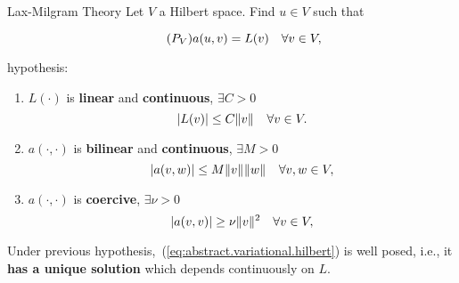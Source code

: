 \begin{frame}{Lax-Milgram Theory}
  \small
  Let $V$ a Hilbert space.
  Find $u\in V$ such that
    \begin{BlockNoTitle}
      \begin{equation}
        \tag{\ensuremath{P_V}}
        a(u,v) = L(v) \quad \forall v\in V,
        \label{eq:abstract.variational.hilbert}
      \end{equation}
    \end{BlockNoTitle}
     hypothesis:
    \begin{enumerate}
    \item $L(\cdot)$ is \textbf{linear} and \textbf{continuous},  $\exists C>0$ 
      \label{item:1}
      \begin{equation*}
        |L(v)|\le C \norm[]{v} \quad \forall v\in V.
      \end{equation*}
    \item $a(\cdot,\cdot)$ is \textbf{bilinear} and \textbf{continuous},  $\exists M>0$ 
      \label{item:2}
      \begin{equation*}
        |a(v,w)|\le M \norm[]{v}\norm[]{w} \quad\forall v,w\in V,
      \end{equation*}
    \item $a(\cdot,\cdot)$ is \textbf{coercive},  $\exists \nu>0$ 
      \label{item:3}
      \begin{equation*}
        |a(v,v)| \ge \nu  \norm[]{v}^2 \quad\forall v\in V,
      \end{equation*}
    \end{enumerate}
    \begin{theorem}
      Under previous
      hypothesis,~\alert{(\ref{eq:abstract.variational.hilbert})} is
        well posed, i.e., it \alert{\textbf{has a unique solution}} which
      depends continuously on $L$.
    \end{theorem}
\end{frame}

